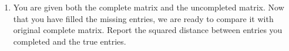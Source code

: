 \begin{enumerate}
\begin{enumerate}
\item You are given both the complete matrix and the uncompleted matrix. Now that you have filled the missing entries, we are ready to compare it with original complete matrix. Report the squared distance between entries you completed and the true entries. 

\end{enumerate} 


\end{enumerate}





